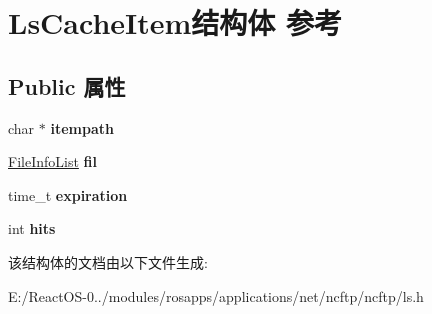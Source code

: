 \hypertarget{struct_ls_cache_item}{}\section{Ls\+Cache\+Item结构体 参考}
\label{struct_ls_cache_item}
\subsection*{Public 属性}
\begin{DoxyCompactItemize}
\item 
\mbox{\label{struct_ls_cache_item_a33b466aa1ca0233e5c9c5256a897ebe2}} 
char $\ast$ {\bfseries itempath}
\item 
\mbox{\label{struct_ls_cache_item_a93754ae8fd36ab341bea7db28ddbc503}} 
\hyperlink{struct_file_info_list}{File\+Info\+List} {\bfseries fil}
\item 
\mbox{\label{struct_ls_cache_item_a9f3d55278f6968062e06811a8779664f}} 
time\+\_\+t {\bfseries expiration}
\item 
\mbox{\label{struct_ls_cache_item_a9a44610b5a3a3e0b0869c9ca901f0250}} 
int {\bfseries hits}
\end{DoxyCompactItemize}


该结构体的文档由以下文件生成\+:\begin{DoxyCompactItemize}
\item 
E\+:/\+React\+O\+S-\/0../modules/rosapps/applications/net/ncftp/ncftp/ls.\+h\end{DoxyCompactItemize}
